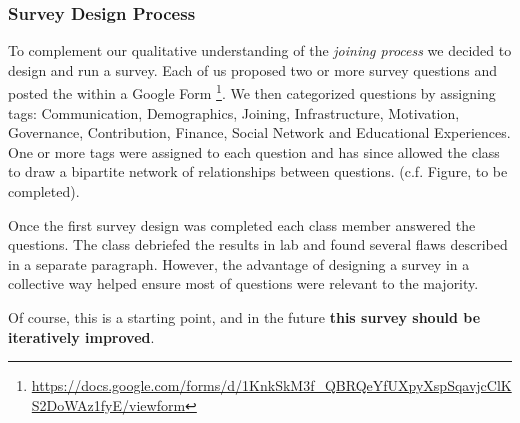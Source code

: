 \subsubsection{Survey Design Process}
To complement our qualitative understanding of the {\it joining process} we decided to design and run a survey. 
Each of us proposed two or more survey questions and posted the within a 
Google Form \footnote{\url{https://docs.google.com/forms/d/1KnkSkM3f_QBRQeYfUXpyXspSqavjcClKS2DoWAz1fyE/viewform}}. 
We then categorized questions by assigning tags: Communication, Demographics, Joining, Infrastructure, Motivation,
Governance, Contribution, Finance, Social Network and Educational Experiences. One or more tags were assigned to each question 
and has since allowed the class to draw a bipartite network of relationships between questions.
(c.f. Figure, to be completed).

Once the first survey design was completed each class member answered the questions. The class debriefed the results in lab and 
found several flaws described in a separate paragraph. However, the advantage of designing a survey in a collective way helped 
ensure most of questions were relevant to the majority. 

Of course, this is a starting point, and in the future {\bf this survey should be iteratively improved}.


